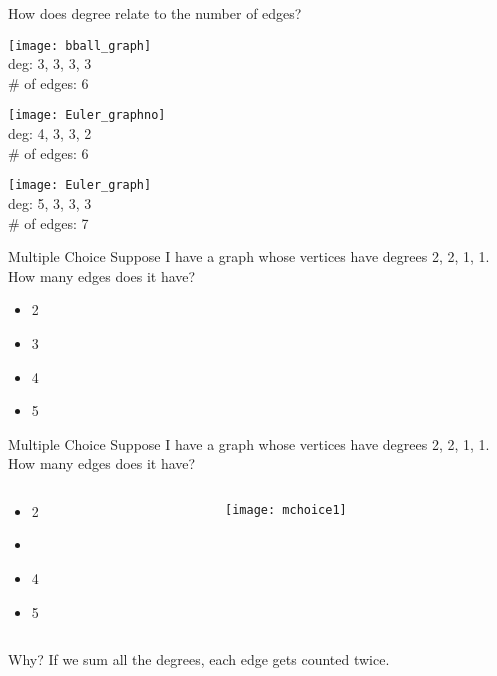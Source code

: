 \documentclass{beamer}
\begin{document}
\begin{frame}
How does degree relate to the number of edges?\vspace*{1cm}\\
\begin{minipage}{.3\textwidth}
\centering
\texttt{[image: bball\_graph]}\\
deg: 3, 3, 3, 3\\
\# of edges: 6
\end{minipage}
\begin{minipage}{.3\textwidth}
\centering
\texttt{[image: Euler\_graphno]}\\
deg: 4, 3, 3, 2\\
\# of edges: 6
\end{minipage}
\begin{minipage}{.3\textwidth}
\centering
\texttt{[image: Euler\_graph]}\\
deg: 5, 3, 3, 3\\
\# of edges: 7
\end{minipage}
\end{frame}
\begin{frame}{Multiple Choice}
Suppose I have a graph whose vertices have degrees 2, 2, 1, 1. How many edges does it have?
\begin{itemize}
\item 2
\item 3
\item 4
\item 5
\end{itemize}
\end{frame}
\begin{frame}{Multiple Choice}
Suppose I have a graph whose vertices have degrees 2, 2, 1, 1. How many edges does it have?
\begin{columns}
\begin{column}{.5\textwidth}
\begin{itemize}
\item 2
\item {}
\item 4
\item 5
\end{itemize}
\end{column}
\begin{column}{.5\textwidth}
\texttt{[image: mchoice1]}
\end{column}
\end{columns}
Why? If we sum all the degrees, each edge gets counted twice.
\end{frame}
\end{document}
